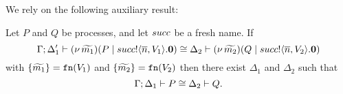 We rely on the following auxiliary result:




\begin{lemma}[Extrusion]\rm
	\label{lem:extrusion}
	Let $P$ and $Q$ be processes, and let $succ$ be a fresh name. 
	If 
	\[
		\Gamma; \Delta_1' \vdash (\nu\, \widetilde{m_1})(P \;|\; succ ! \langle \overline{n}, V_1 \rangle . \mathbf{0}) \cong \Delta_2 \vdash (\nu\, \widetilde{m_2})(Q \;|\; succ ! \langle \overline{n}, V_2 \rangle . \mathbf{0})
	\]
	with 
	 $\{\widetilde{m_1}\}= \mathtt{fn}(V_1)$ and $\{\widetilde{m_2}\} = \mathtt{fn}(V_2)$
	then there exist $\Delta_1$ and $\Delta_2$ such that
	\[
		\Gamma; \Delta_1 \vdash P \cong \Delta_2 \vdash Q.
	\]
\end{lemma}

